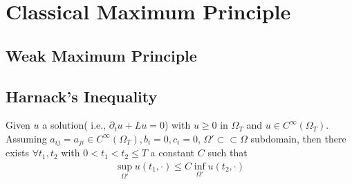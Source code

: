 \section{Classical Maximum Principle}
\subsection{Weak Maximum Principle}

\subsection{Harnack's Inequality}
\begin{theorem}
	Given $u$ a solution( i.e., $\partial_t u + Lu = 0$) with $u \ge 0$ in $\Omega_T$ and $u \in C^\infty(\Omega_T)$. Assuming $a_{ij} = a_{ji} \in C^\infty(\Omega_T), b_i = 0, c_i = 0$, $\Omega' \subset \subset \Omega$ subdomain,  then there exists $\forall t_1, t_2$ with  $0 < t_1 < t_2 \le T$ a constant $C$ such that
	\begin{align*}
		\sup_{\Omega'} u(t_1, \cdot) \le C \inf_{\Omega'} u(t_2, \cdot)
	\end{align*}
\end{theorem}

